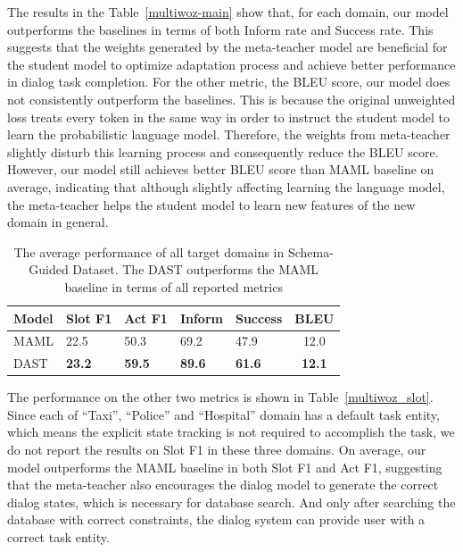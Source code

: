 \documentclass[letterpaper]{article} %
\begin{document}
The results in the Table~\ref{multiwoz-main} show that, for each domain, our model outperforms the baselines in terms of both Inform rate and Success rate. This suggests that the weights generated by the meta-teacher model are beneficial for the student model to optimize adaptation process and achieve better performance in dialog task completion.
%
For the other metric, the BLEU score, our model does not consistently outperform the baselines. This is because the original unweighted loss treats every token in the same way in order to instruct the student model to learn the probabilistic language model. Therefore, the weights from meta-teacher slightly disturb this learning process and consequently reduce the BLEU score. However, our model still achieves better BLEU score than MAML baseline on average, indicating that although slightly affecting learning the language model, the meta-teacher helps the student model to learn new features of the new domain in general.
%



\begin{table}[h]
\centering
\setlength{\extrarowheight}{0.06cm}
\small
\begin{tabular}[width=\columnwidth]{l|C{0.9cm}C{0.85cm}C{0.8cm}C{0.8cm}c}
    \toprule
    \hline
    \textbf{Model}  & Slot F1       &Act F1    & Inform      &Success     & BLEU\\
    \hline
    MAML    &  22.5&50.3&69.2&47.9   &12.0   \\
    DAST    & \textbf{23.2}&\textbf{59.5}&\textbf{89.6}&\textbf{61.6}&\textbf{12.1} \\
    \hline
    \bottomrule

\end{tabular}
\caption{The average performance of all target domains in Schema-Guided Dataset. The DAST outperforms the MAML baseline in terms of all reported metrics}
\label{schema}
\end{table}




The performance on the other two metrics is shown in Table~\ref{multiwoz_slot}.
Since each of ``Taxi'', ``Police'' and ``Hospital'' domain has a default task entity, which means the explicit state tracking is not required to accomplish the task, we do not report the results on Slot F1 in these three domains. On average, our model outperforms the MAML baseline in both Slot F1 and Act F1, suggesting that the meta-teacher also encourages the dialog model to generate the correct dialog states, which is necessary for database search. And only after searching the database with correct constraints, the dialog system can provide user with a correct task entity. 
\end{document}
